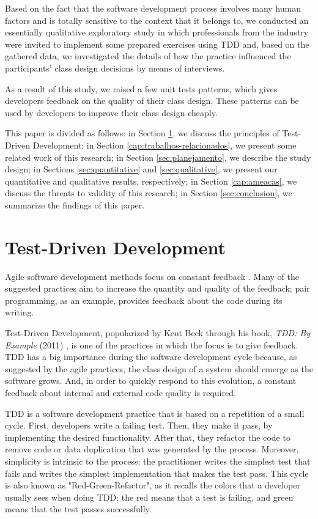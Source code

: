 \documentclass[times]{speauth}
\begin{document}
Based on the fact that the software development process involves many
human factors and is totally sensitive to the context that it belongs to,
we conducted an essentially qualitative exploratory study in which professionals
from the industry were invited to implement some prepared exercises using TDD and,
based on the gathered data, we investigated the details of how the practice influenced
the participants' class design decisions by means of interviews.

As a result of this study, we raised a few unit tests patterns, which gives developers
feedback on the quality of their class design. These patterns can be used by developers
to improve their class design cheaply.

This paper is divided as follows: in Section \ref{sec:tdd}, we discuss the principles
of Test-Driven Development; in Section \ref{cap:trabalhos-relacionados}, we present
some related work of this research; in Section \ref{sec:planejamento}, we describe the
study design; in Sections \ref{sec:quantitative} and \ref{sec:qualitative}, we present
our quantitative and qualitative results, respectively; in Section \ref{cap:ameacas},
we discuss the threats to validity of this research; in Section \ref{sec:conclusion},
we summarize the findings of this paper.


\section{Test-Driven Development}
\label{sec:tdd}

Agile software development methods focus on constant feedback \cite{AgileManifesto}. 
Many of the suggested practices
aim to increase the quantity and quality of the feedback; pair programming,
as an example, provides feedback about the code during its writing.

Test-Driven Development, popularized by Kent Beck through his book, \textit{TDD: By Example} (2011)
\cite{TDDByExample}, is one of the practices in which the focus is to give feedback. TDD has
a big importance during the software development cycle because, as suggested by the agile
practices, the class design of a system should emerge as the software grows. And, in order
to quickly respond to this evolution, a constant feedback about internal and external code
quality is required.

TDD is a software development practice that is based on a repetition of a small
cycle. First, developers write a failing test. Then, they make it pass,
by implementing the desired functionality. After that, they refactor the code
to remove code or data duplication that was generated by the process. Moreover,
simplicity is intrinsic to the process: the practitioner writes the simplest
test that fails and writes the simplest implementation that makes the
test pass. This cycle is also known as "Red-Green-Refactor", as it recalls the
colors that a developer usually sees when doing TDD: the red means that a test
is failing, and green means that the test passes successfully.
\end{document}
